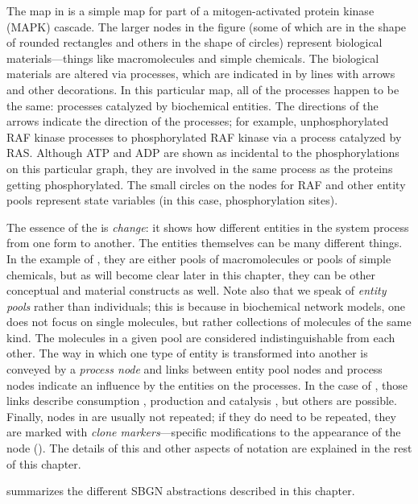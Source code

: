The map in  is a simple map for part of a mitogen-activated protein kinase (MAPK) cascade.  The larger nodes in the figure (some of which are in the shape of rounded rectangles and others in the shape of circles) represent biological materials---things like macromolecules and simple chemicals.  The biological materials are altered via processes, which are indicated in \PD by lines with arrows and other decorations.  In this particular map, all of the processes happen to be the same: processes catalyzed by biochemical entities.  The directions of the arrows indicate the direction of the processes; for example, unphosphorylated RAF kinase processes to phosphorylated RAF kinase via a process catalyzed by RAS. Although ATP and ADP are shown as incidental to the phosphorylations on this particular graph, they are involved in the same process as the proteins getting phosphorylated. The small circles on the nodes for RAF and other entity pools represent state variables (in this case, phosphorylation sites). 

The essence of the \PD is \emph{change}: it shows how different entities in the system process from one form to another.  The entities themselves can be many different things.  In the example of , they are either pools of macromolecules or pools of simple chemicals, but as will become clear later in this chapter, they can be other conceptual and material constructs as well.  Note also that we speak of \emph{entity pools} rather than individuals; this is because in biochemical network models, one does not focus on single molecules, but rather collections of molecules of the same kind.  The molecules in a given pool are considered indistinguishable from each other.  The way in which one type of entity is transformed into another is conveyed by a \emph{process node} and links between entity pool nodes and process nodes indicate an influence by the entities on the processes.  In the case of , those links describe consumption , production  and catalysis , but others are possible.  Finally, nodes in \PDs are usually not repeated; if they do need to be repeated, they are marked with \emph{clone markers}---specific modifications to the appearance of the node (). The details of this and other aspects of \PD notation are explained in the rest of this chapter.

 summarizes the different SBGN abstractions described in this chapter.

